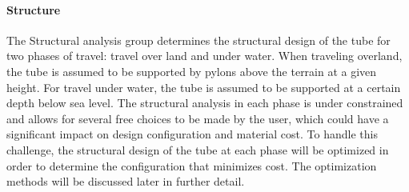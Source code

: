 \paragraph{Structure}
The Structural analysis group determines the structural design of the tube for two phases of travel: travel over land and under water. When traveling overland, the tube is assumed to be supported by pylons above the terrain at a given height. For travel under water, the tube is assumed to be supported at a certain depth below sea level. The structural analysis in each phase is under constrained and allows for several free choices to be made by the user, which could have a significant impact on design configuration and material cost. To handle this challenge, the structural design of the tube at each phase will be optimized in order to determine the configuration that minimizes cost. The optimization methods will be discussed later in further detail.

